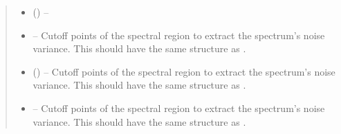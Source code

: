 \documentclass[letterpaper,10pt,english]{sphinxmanual}
\begin{document}
\begin{fulllineitems}
\begin{fulllineitems}
\begin{quote}
\begin{description}
\begin{itemize}
\item {} 
\sphinxAtStartPar
{} (\sphinxstyleliteralemphasis{\sphinxupquote{{[}}}\sphinxstyleliteralemphasis{\sphinxupquote{{[}}}\sphinxstyleliteralemphasis{\sphinxupquote{, }}\sphinxstyleliteralemphasis{\sphinxupquote{{]}}}\sphinxstyleliteralemphasis{\sphinxupquote{{]}}}\sphinxstyleliteralemphasis{\sphinxupquote{, }}\sphinxstyleliteralemphasis{\sphinxupquote{{[}}}\sphinxstyleliteralemphasis{\sphinxupquote{{[}}}\sphinxstyleliteralemphasis{\sphinxupquote{, }}\sphinxstyleliteralemphasis{\sphinxupquote{{]}}}\sphinxstyleliteralemphasis{\sphinxupquote{, }}\sphinxstyleliteralemphasis{\sphinxupquote{{[}}}\sphinxstyleliteralemphasis{\sphinxupquote{, }}\sphinxstyleliteralemphasis{\sphinxupquote{{]}}}\sphinxstyleliteralemphasis{\sphinxupquote{{]}}}\sphinxstyleliteralemphasis{\sphinxupquote{,}}) – 

\item {} 
\sphinxAtStartPar
\sphinxstyleliteralstrong{\sphinxupquote{{[}}}\sphinxstyleliteralstrong{\sphinxupquote{{[}}} – Cut\sphinxhyphen{}off points of the spectral region to extract the spectrum’s
noise variance. This should have the same structure as .

\item {} 
\sphinxAtStartPar
{}\sphinxstyleliteralstrong{\sphinxupquote{ {[}}}\sphinxstyleliteralstrong{\sphinxupquote{{[}}} (\sphinxstyleliteralemphasis{\sphinxupquote{{]}}}\sphinxstyleliteralemphasis{\sphinxupquote{{]}}}) – Cut\sphinxhyphen{}off points of the spectral region to extract the spectrum’s
noise variance. This should have the same structure as .

\item {} 
\sphinxAtStartPar
{}\sphinxstyleliteralstrong{\sphinxupquote{{]}}} – Cut\sphinxhyphen{}off points of the spectral region to extract the spectrum’s
noise variance. This should have the same structure as .


\end{itemize}
\end{description}
\end{quote}
\end{fulllineitems}
\end{fulllineitems}
\end{document}
